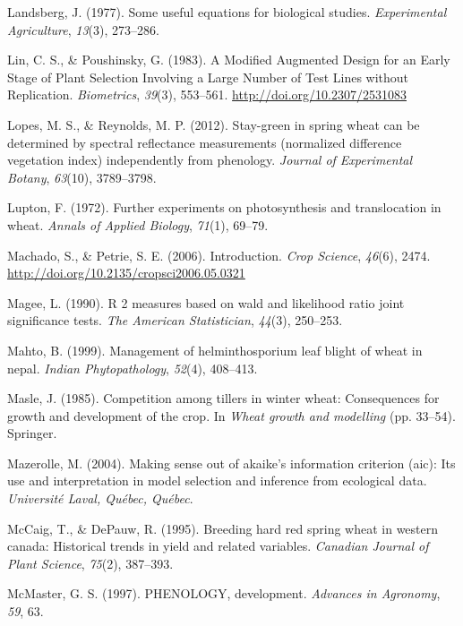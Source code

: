 \documentclass[12pt,oneside]{dukestatscithesis} %
\theoremstyle{definition}
\theoremstyle{definition}
\theoremstyle{definition}
\theoremstyle{remark}
\begin{document}
\hypertarget{ref-landsberg1977some}{}
Landsberg, J. (1977). Some useful equations for biological studies.
\emph{Experimental Agriculture}, \emph{13}(3), 273--286.

\hypertarget{ref-lin_modified_1983}{}
Lin, C. S., \& Poushinsky, G. (1983). A Modified Augmented Design for an
Early Stage of Plant Selection Involving a Large Number of Test Lines
without Replication. \emph{Biometrics}, \emph{39}(3), 553--561.
\url{http://doi.org/10.2307/2531083}

\hypertarget{ref-lopes2012stay}{}
Lopes, M. S., \& Reynolds, M. P. (2012). Stay-green in spring wheat can
be determined by spectral reflectance measurements (normalized
difference vegetation index) independently from phenology. \emph{Journal
of Experimental Botany}, \emph{63}(10), 3789--3798.

\hypertarget{ref-lupton1972further}{}
Lupton, F. (1972). Further experiments on photosynthesis and
translocation in wheat. \emph{Annals of Applied Biology}, \emph{71}(1),
69--79.

\hypertarget{ref-machado_introduction_2006}{}
Machado, S., \& Petrie, S. E. (2006). Introduction. \emph{Crop Science},
\emph{46}(6), 2474. \url{http://doi.org/10.2135/cropsci2006.05.0321}

\hypertarget{ref-magee1990r}{}
Magee, L. (1990). R 2 measures based on wald and likelihood ratio joint
significance tests. \emph{The American Statistician}, \emph{44}(3),
250--253.

\hypertarget{ref-mahto1999management}{}
Mahto, B. (1999). Management of helminthosporium leaf blight of wheat in
nepal. \emph{Indian Phytopathology}, \emph{52}(4), 408--413.

\hypertarget{ref-masle1985competition}{}
Masle, J. (1985). Competition among tillers in winter wheat:
Consequences for growth and development of the crop. In \emph{Wheat
growth and modelling} (pp. 33--54). Springer.

\hypertarget{ref-mazerolle2004making}{}
Mazerolle, M. (2004). Making sense out of akaike's information criterion
(aic): Its use and interpretation in model selection and inference from
ecological data. \emph{Université Laval, Québec, Québec}.

\hypertarget{ref-mccaig1995breeding}{}
McCaig, T., \& DePauw, R. (1995). Breeding hard red spring wheat in
western canada: Historical trends in yield and related variables.
\emph{Canadian Journal of Plant Science}, \emph{75}(2), 387--393.

\hypertarget{ref-mcmaster1997phenology}{}
McMaster, G. S. (1997). PHENOLOGY, development. \emph{Advances in
Agronomy}, \emph{59}, 63.
\end{document}
